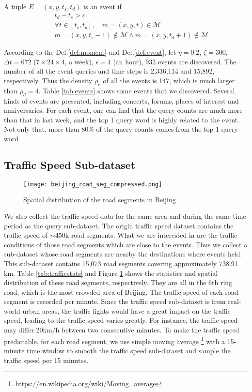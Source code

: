\begin{definition}[Event]
    \label{def:event}
    A tuple $E =  (x, y, t_s, t_d)$ is an event if 
    \begin{eqnarray}
    \label{eq:event}
    && t_d - t_s > \epsilon \\
    && \forall t \in [t_s, t_d], \quad m =  (x, y, t) \in \mathcal{M} \\
    && m =  (x, y, t_s - 1) \not\in \mathcal{M} \land m =  (x, y, t_d + 1) \not\in \mathcal{M}
    \end{eqnarray}
\end{definition}

According to the Def.\ref{def:moment} and Def.\ref{def:event}, let $\eta = 0.2$, $\zeta = 300$, $\Delta t = 672$  ($7 \times 24 \times 4$, a week), $\epsilon = 4$ (an hour), 932 events are discovered. The number of all the event queries and time steps is 2,336,114 and 15,892, respectively. Thus the density $\rho_e$ of all the events is 147, which is much larger than $\rho_d=4$. Table \ref{tab:events} shows some events that we discovered. Several kinds of events are presented, including concerts, forums, places of interest and anniversaries. For each event, one can find that the query counts are much more than that in last week, and the top 1 query word is highly related to the event. Not only that, more than 80\% of the query counts comes from the top 1 query word.


\subsection{Traffic Speed Sub-dataset}

\begin{figure}[htbp]
\centering
\texttt{[image: beijing\_road\_seg\_compressed.png]}
\caption{Spatial distribution of the road segments in Beijing}
\label{fig:roadnetwork}
\end{figure}

We also collect the traffic speed data for the same area and during the same time period as the query sub-dataset. The origin traffic speed dataset contains the traffic speed of $\sim$450k road segments. What we are interested in are the traffic conditions of those road segments which are close to the events. Thus we collect a sub-dataset whose road segments are nearby the destinations where events held. This sub-dataset contains 15,073 road segments covering approximately 738.91 km. Table \ref{tab:trafficstats} and Figure  \ref{fig:roadnetwork} shows the statistics and spatial distribution of these road segments, respectively. They are all in the 6th ring road, which is the most crowded area of Beijing. The traffic speed of each road segment is recorded per minute. Since the traffic speed sub-dataset is from real-world urban areas, the traffic lights would have a great impact on the traffic speed, leading to the traffic speed varies greatly. For instance, the traffic speed may differ 20km/h between two consecutive minutes. To make the traffic speed predictable, for each road segment, we use simple moving average \footnote{https://en.wikipedia.org/wiki/Moving\_average} with a 15-minute time window to smooth the traffic speed sub-dataset and sample the traffic speed per 15 minutes. 

